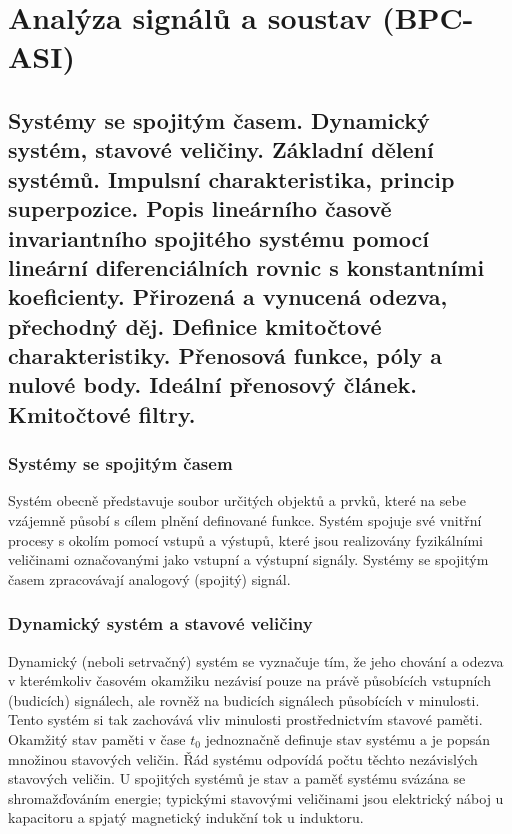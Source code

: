 \section{Analýza signálů a soustav (BPC-ASI)}
\subsection{Systémy se spojitým časem. Dynamický systém, stavové veličiny. Základní dělení systémů. Impulsní charakteristika, princip superpozice. Popis lineárního časově invariantního spojitého systému pomocí lineární diferenciálních rovnic s konstantními koeficienty. Přirozená a vynucená odezva, přechodný děj. Definice kmitočtové charakteristiky. Přenosová funkce, póly a nulové body. Ideální přenosový článek. Kmitočtové filtry. }
    \subsubsection{Systémy se spojitým časem}
        Systém obecně představuje soubor určitých objektů a prvků, které na sebe vzájemně působí s cílem plnění definované funkce. Systém spojuje své vnitřní procesy s okolím pomocí vstupů a výstupů, které jsou realizovány fyzikálními veličinami označovanými jako vstupní a výstupní signály. Systémy se spojitým časem zpracovávají analogový (spojitý) signál.
    
    \subsubsection{Dynamický systém a stavové veličiny} 
        Dynamický (neboli setrvačný) systém se vyznačuje tím, že jeho chování a odezva v kterémkoliv časovém okamžiku nezávisí pouze na právě působících vstupních (budicích) signálech, ale rovněž na budicích signálech působících v minulosti. Tento systém si tak zachovává vliv minulosti prostřednictvím stavové paměti. Okamžitý stav paměti v čase $t_0$ jednoznačně definuje stav systému a je popsán množinou stavových veličin. Řád systému odpovídá počtu těchto nezávislých stavových veličin. U spojitých systémů je stav a paměť systému svázána se shromažďováním energie; typickými stavovými veličinami jsou elektrický náboj u kapacitoru a spjatý magnetický indukční tok u induktoru.
